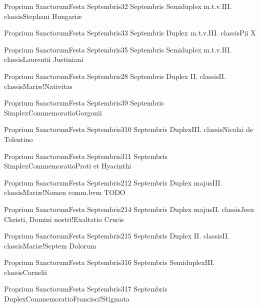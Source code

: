 \documentclass[psalterium-feriale.tex]{subfiles}
\begin{document}
	{Proprium Sanctorum}{Festa Septembris}{3}{2 Septembris}
	{Semiduplex m.t.v.}{III. classis}{Stephani Hungariæ}
	{}
	{}

	{Proprium Sanctorum}{Festa Septembris}{3}{3 Septembris}
	{Duplex m.t.v.}{III. classis}{Pii X}
	{}
	{}

	{Proprium Sanctorum}{Festa Septembris}{3}{5 Septembris}
	{Semiduplex m.t.v.}{III. classis}{Laurentii Justiniani}
	{}
	{}

	{Proprium Sanctorum}{Festa Septembris}{2}{8 Septembris}
	{Duplex II. classis}{II. classis}{Mariæ!Nativitas}
	{}
	{}
\psalmodiapropria

	{Proprium Sanctorum}{Festa Septembris}{3}{9 Septembris}
	{Simplex}{Commemoratio}{Gorgonii}
	{}
	{\invitferia}

	{Proprium Sanctorum}{Festa Septembris}{3}{10 Septembris}
	{Duplex}{III. classis}{Nicolai de Tolentino}
	{}
	{}

	{Proprium Sanctorum}{Festa Septembris}{3}{11 Septembris}
	{Simplex}{Commemoratio}{Proti et Hyacinthi}
	{}
	{\invitferia}

	{Proprium Sanctorum}{Festa Septembris}{2}{12 Septembris}
	{Duplex majus}{III. classis}{Mariæ!Nomen}
	{\psalmodiapropria}
	{comm.bvm TODO}

	{Proprium Sanctorum}{Festa Septembris}{2}{14 Septembris}
	{Duplex majus}{II. classis}{Jesu Christi, Domini nostri!Exaltatio Crucis}
	{}
	{}
\psalmodiapropria

	{Proprium Sanctorum}{Festa Septembris}{2}{15 Septembris}
	{Duplex II. classis}{II. classis}{Mariæ!Septem Dolorum}
	{}
	{}
\psalmodiapropria

	{Proprium Sanctorum}{Festa Septembris}{3}{16 Septembris}
	{Semiduplex}{III. classis}{Cornelii}
	{}
	{}

	{Proprium Sanctorum}{Festa Septembris}{3}{17 Septembris}
	{Duplex}{Commemoratio}{Francisci!Stigmata}
	{}
	{}
\end{document}
